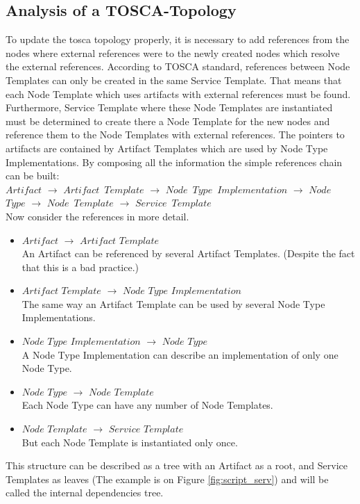 \subsection{Analysis of a TOSCA-Topology}\label{subs:analyse}
To update the \gls{tosca} topology properly, it is necessary to add references from the nodes where external references were to the newly created nodes which resolve the external references. 
According to TOSCA standard, references between Node Templates can only be created in the same Service Template.  
That means that each Node Template which uses artifacts with external references must be found.
Furthermore, Service Template where these Node Templates are instantiated must be determined to create there a Node Template for the new nodes and reference them to the Node Templates with external references.
The pointers to artifacts are contained by Artifact Templates which are used by Node Type Implementations.
By composing all the information the simple references chain can be built:\\
$Artifact$ $\rightarrow$ $Artifact$~$Template$ $\rightarrow$ $Node$~$Type$~$Implementation$ $\rightarrow$ $Node$~$Type$ $\rightarrow$ $Node$~$Template$ $\rightarrow$ $Service$~$Template$\\
Now consider the references in more detail. 
\begin{itemize}
	\item $Artifact$ $\rightarrow$ $Artifact$ $Template$\\
	An Artifact can be referenced by several Artifact Templates. (Despite the fact that this is a bad practice.)
	\item  $Artifact$ $Template$ $\rightarrow$ $Node$ $Type$ $Implementation$ \\
	The same way an Artifact Template can be used by several Node Type Implementations.
	\item $Node$ $Type$ $Implementation$ $\rightarrow$ $Node$ $Type$ \\
	A Node Type Implementation can describe an implementation of only one Node Type.
	\item  $Node$ $Type$ $\rightarrow$ $Node$ $Template$\\
	Each Node Type can have any number of Node Templates.
	\item  $Node$ $Template$ $\rightarrow$ $Service$ $Template$\\
	But each Node Template is instantiated only once.
\end{itemize}
This structure can be described as a tree with an Artifact as a root, and Service Templates as leaves (The example is on Figure \ref{fig:script_serv}) and will be called the internal dependencies tree.\\
